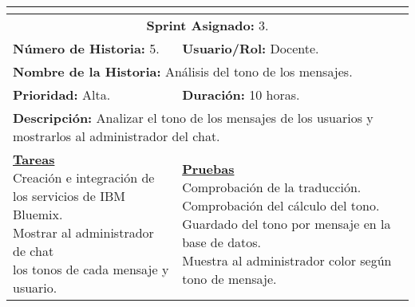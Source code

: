 \resizebox{15cm}{!} {
	\begin{tabular}{|l|l|}
		\hline
		\multicolumn{2}{|c|}{\cellcolor[HTML]{343434}{\color[HTML]{FFFFFF} \textbf{Historia de Usuario}}} \\
		\hline
		\multicolumn{2}{|c|}{\textbf{Sprint Asignado:} 3.} \\
		\hline
		\textbf{Número de Historia:} 5. & \textbf{Usuario/Rol:} Docente.\\
		\hline
		\multicolumn{2}{|l|}{\textbf{Nombre de la Historia:} Análisis del tono de los mensajes.} \\
		\hline
		\textbf{Prioridad:} Alta. & \textbf{Duración:} 10 horas.\\
		\hline
		\multicolumn{2}{|l|}{\textbf{Descripción:} Analizar el tono de los mensajes de los usuarios y mostrarlos al administrador del chat.} \\
		\hline
		\specialcell{\underline{\textbf{Tareas}} \\ Creación e integración de \\ los servicios de IBM Bluemix. \\ Mostrar al administrador de chat \\ los tonos de cada mensaje y usuario.} & \specialcell{\underline{\textbf{Pruebas}} \\ Comprobación de la traducción. \\ Comprobación del cálculo del tono. \\ Guardado del tono por mensaje en la base de datos. \\ Muestra al administrador color según tono de mensaje.} \\
		\hline
	\end{tabular}
}
